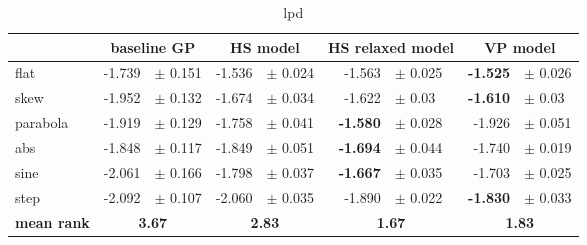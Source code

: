 \begin{table}[] 
 \centering
\begin{tabular}{lrlrlrlrl}
\hline
 &  \multicolumn{2}{c}{baseline GP}  &  \multicolumn{2}{c}{HS model}  &  \multicolumn{2}{c}{HS relaxed model}  &  \multicolumn{2}{c}{VP model}  \\
\hline
flat & -1.739 & $\pm$ 0.151 & -1.536 & $\pm$ 0.024 & -1.563 & $\pm$ 0.025 & \textbf{-1.525} & $\pm$ 0.026 \\
skew & -1.952 & $\pm$ 0.132 & -1.674 & $\pm$ 0.034 & -1.622 & $\pm$ 0.03 & \textbf{-1.610} & $\pm$ 0.03 \\
parabola & -1.919 & $\pm$ 0.129 & -1.758 & $\pm$ 0.041 & \textbf{-1.580} & $\pm$ 0.028 & -1.926 & $\pm$ 0.051 \\
abs & -1.848 & $\pm$ 0.117 & -1.849 & $\pm$ 0.051 & \textbf{-1.694} & $\pm$ 0.044 & -1.740 & $\pm$ 0.019 \\
sine & -2.061 & $\pm$ 0.166 & -1.798 & $\pm$ 0.037 & \textbf{-1.667} & $\pm$ 0.035 & -1.703 & $\pm$ 0.025 \\
step & -2.092 & $\pm$ 0.107 & -2.060 & $\pm$ 0.035 & -1.890 & $\pm$ 0.022 & \textbf{-1.830} & $\pm$ 0.033 \\
\hline
\textbf{mean rank} & \multicolumn{2}{c}{\textbf{3.67}} & \multicolumn{2}{c}{\textbf{2.83}} & \multicolumn{2}{c}{\textbf{1.67}} & \multicolumn{2}{c}{\textbf{1.83}}\\
\hline
\end{tabular}
\caption{lpd}
\label{tab:lpd}
\end{table}
